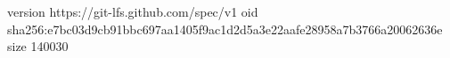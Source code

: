 version https://git-lfs.github.com/spec/v1
oid sha256:e7bc03d9cb91bbc697aa1405f9ac1d2d5a3e22aafe28958a7b3766a20062636e
size 140030
